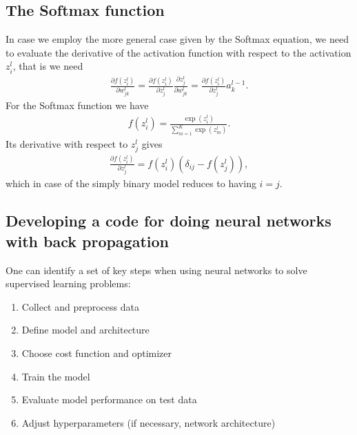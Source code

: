 \documentclass[letterpaper,10pt,english]{sphinxmanual}
\begin{document}
\subsection{The Softmax function}
\label{\detokenize{chapter6:the-softmax-function}}
In case we employ the more general case given by the Softmax equation, we need to evaluate the derivative of the activation function with respect to the activation \(z_i^l\), that is we need
\begin{equation*}
\begin{split}
\frac{\partial f(z_i^l)}{\partial w_{jk}^l} =
\frac{\partial f(z_i^l)}{\partial z_j^l} \frac{\partial z_j^l}{\partial w_{jk}^l}= \frac{\partial f(z_i^l)}{\partial z_j^l}a_k^{l-1}.
\end{split}
\end{equation*}
For the Softmax function we have
\begin{equation*}
\begin{split}
f(z_i^l) = \frac{\exp{(z_i^l)}}{\sum_{m=1}^K\exp{(z_m^l)}}.
\end{split}
\end{equation*}
Its derivative with respect to \(z_j^l\) gives
\begin{equation*}
\begin{split}
\frac{\partial f(z_i^l)}{\partial z_j^l}= f(z_i^l)\left(\delta_{ij}-f(z_j^l)\right),
\end{split}
\end{equation*}
which in case of the simply binary model reduces to  having \(i=j\).


\subsection{Developing a code for doing neural networks with back propagation}
\label{\detokenize{chapter6:developing-a-code-for-doing-neural-networks-with-back-propagation}}
One can identify a set of key steps when using neural networks to solve supervised learning problems:
\begin{enumerate}
%
\item {} 
Collect and pre\sphinxhyphen{}process data

\item {} 
Define model and architecture

\item {} 
Choose cost function and optimizer

\item {} 
Train the model

\item {} 
Evaluate model performance on test data

\item {} 
Adjust hyperparameters (if necessary, network architecture)

\end{enumerate}
\end{document}
